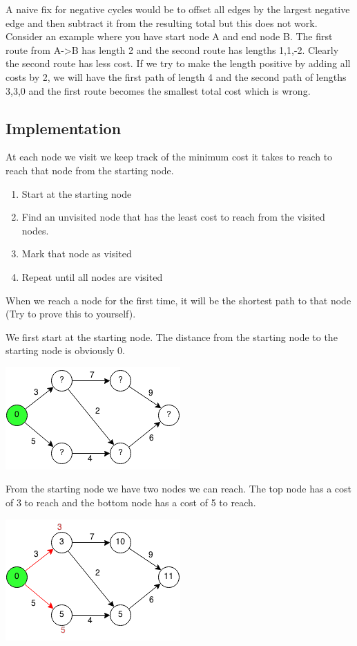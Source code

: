 \documentclass[11pt,oneside]{book}
\makeatletter
\def\maxwidth#1{\ifdim\Gin@nat@width>#1 #1\else\Gin@nat@width\fi}
\makeatother
\begin{document}
A naive fix for negative cycles would be to offset all edges by the largest negative edge and then subtract it from the resulting total but this does not work. Consider an example where you have start node A and end node B. The first route from A->B has length 2 and the second route has lengths 1,1,-2. Clearly the second route has less cost. If we try to make the length positive by adding all costs by 2, we will have the first path of length 4 and the second path of lengths 3,3,0 and the first route becomes the smallest total cost which is wrong.

\subsection{Implementation}

At each node we visit we keep track of the minimum cost it takes to reach to reach that node from the starting node.

\begin{enumerate}
\item Start at the starting node
\item Find an unvisited node that has the least cost to reach from the visited nodes.
\item Mark that node as visited
\item Repeat until all nodes are visited
\end{enumerate}

When we reach a node for the first time, it will be the shortest path to that node (Try to prove this to yourself).

We first start at the starting node. The distance from the starting node to the starting node is obviously 0.

\includegraphics[width=\maxwidth{\textwidth}]{djikstra.png}

From the starting node we have two nodes we can reach. The top node has a cost of 3 to reach and the bottom node has a cost of 5 to reach.

\includegraphics[width=\maxwidth{\textwidth}]{djikstra1.png}
\end{document}
